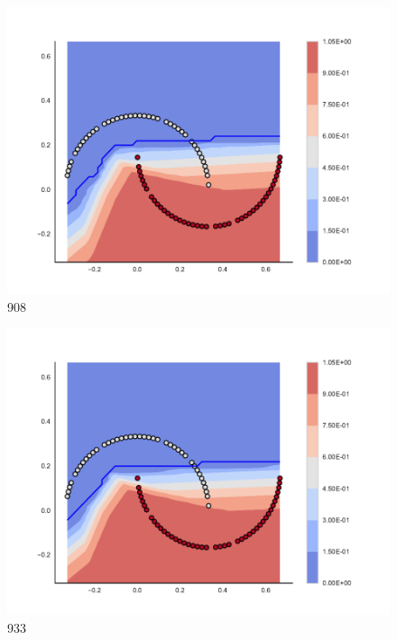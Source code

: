 \begin{subfigure}[b]{0.09\textwidth}
    \includegraphics[clip, trim=2.35cm 1.75cm 4.5cm 0cm,width=\textwidth]{img/convergence/908.pdf}
    \caption{908}
    \label{fig:convergence_908}
\end{subfigure}
%
\begin{subfigure}[b]{0.09\textwidth}
    \includegraphics[clip, trim=2.35cm 1.75cm 4.5cm 0cm,width=\textwidth]{img/convergence/933.pdf}
    \caption{933}
    \label{fig:convergence_933}
\end{subfigure}
%
